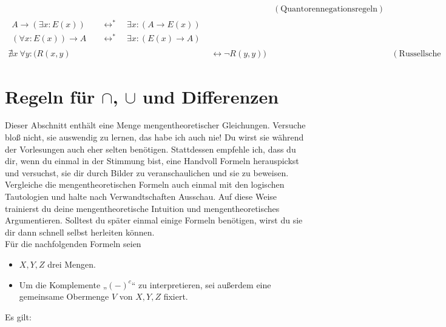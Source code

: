 \begin{align*}
\begin{split}
    \end{split} && (\text{Quantorennegationsregeln}) \\[1em]
    \begin{split}
        A \to( \exists x : E(x)) & \quad\leftrightarrow^*\quad \exists x : ( A\to E(x)) \\ %
        (\forall x : E(x)) \to A & \quad\leftrightarrow^*\quad \exists x : (E(x) \to A) %
    \end{split} \\[1em]
    \nexists x \ \forall y : (R(x,y) & \leftrightarrow \neg R(y,y)) && (\text{Russellsche Antinomie})
\end{align*}
\endgroup





\section{Regeln für $\cap$, $\cup$ und Differenzen}
Dieser Abschnitt enthält eine Menge mengentheoretischer Gleichungen. Versuche bloß nicht, sie auswendig zu lernen, das habe ich auch nie! Du wirst sie während der Vorlesungen auch eher selten benötigen. Stattdessen empfehle ich, dass du dir, wenn du einmal in der Stimmung bist, eine Handvoll Formeln herauspickst und versuchst, sie dir durch Bilder zu veranschaulichen und sie zu beweisen. Vergleiche die mengentheoretischen Formeln auch einmal mit den logischen Tautologien und halte nach Verwandtschaften Ausschau. Auf diese Weise trainierst du deine mengentheoretische Intuition und mengentheoretisches Argumentieren. Solltest du später einmal einige Formeln benötigen, wirst du sie dir dann schnell selbst herleiten können. \\[0.5em]
Für die nachfolgenden Formeln seien
\begin{itemize}
    \item $X,Y,Z$ drei Mengen.
    \item Um die Komplemente „$(-)^c$“ zu interpretieren, sei außerdem eine gemeinsame Obermenge $V$ von $X,Y,Z$ fixiert.
\end{itemize}
Es gilt:
\begingroup
\allowdisplaybreaks
